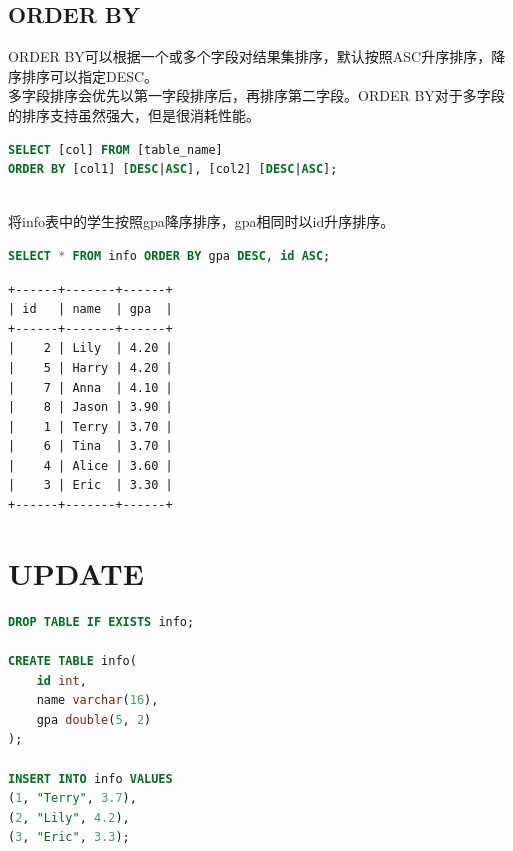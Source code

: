 \documentclass[12pt, openany, oneside]{book}
\begin{document}
\vspace{0.5cm}

\section{ORDER BY}

ORDER BY可以根据一个或多个字段对结果集排序，默认按照ASC升序排序，降序排序可以指定DESC。\\

多字段排序会优先以第一字段排序后，再排序第二字段。ORDER BY对于多字段的排序支持虽然强大，但是很消耗性能。

\vspace{-0.5cm}

\begin{lstlisting}[language=SQL]
SELECT [col] FROM [table_name]
ORDER BY [col1] [DESC|ASC], [col2] [DESC|ASC];
\end{lstlisting}

\vspace{0.5cm}

\\

将info表中的学生按照gpa降序排序，gpa相同时以id升序排序。

\vspace{-0.5cm}

\begin{lstlisting}[language=SQL]
SELECT * FROM info ORDER BY gpa DESC, id ASC;
\end{lstlisting}

\begin{tcolorbox}
	\begin{verbatim}
+------+-------+------+
| id   | name  | gpa  |
+------+-------+------+
|    2 | Lily  | 4.20 |
|    5 | Harry | 4.20 |
|    7 | Anna  | 4.10 |
|    8 | Jason | 3.90 |
|    1 | Terry | 3.70 |
|    6 | Tina  | 3.70 |
|    4 | Alice | 3.60 |
|    3 | Eric  | 3.30 |
+------+-------+------+
\end{verbatim}
\end{tcolorbox}

\newpage

\chapter{UPDATE}

\vspace{0.5cm}


\begin{lstlisting}[language=SQL]
DROP TABLE IF EXISTS info;

CREATE TABLE info(
    id int,
    name varchar(16),
    gpa double(5, 2)
);

INSERT INTO info VALUES
(1, "Terry", 3.7),
(2, "Lily", 4.2),
(3, "Eric", 3.3);
\end{lstlisting}
\end{document}
